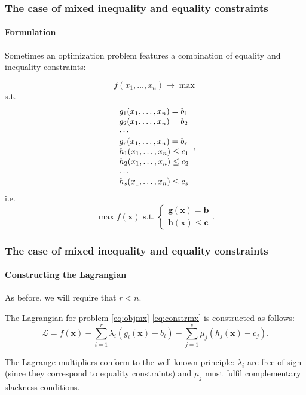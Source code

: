 \documentclass[10pt]{beamer}
\theoremstyle{definition}
\begin{document}
\begin{frame}[fragile]
\frametitle{The case of mixed inequality and equality constraints}
\framesubtitle{Formulation}
Sometimes an optimization problem features a combination of  equality and inequality constraints:

\begin{equation}
f(x_1,\ldots,x_n)\rightarrow \max 
\label{eq:objmx}
\end{equation}
s.t.
\begin{equation}
\begin{array}{l l l}
g_1(x_1,\ldots,x_n) = b_1\\
g_2(x_1,\ldots,x_n) = b_2\\
\cdots \\
g_r(x_1,\ldots,x_n) = b_r\\
h_1(x_1,\ldots,x_n) \leq c_1\\
h_2(x_1,\ldots,x_n) \leq c_2\\
\cdots \\
h_s(x_1,\ldots,x_n) \leq c_s\\
\end{array},
\label{eq:constrmx}
\end{equation}
i.e. \begin{equation*}
\max f(\mathbf{x}) \text{ s.t. } \left\{ \begin{array}{l}
\mathbf{g}(\mathbf{x}) = \mathbf{b}\\
\mathbf{h}(\mathbf{x})\leq \mathbf{c}
\end{array} \right. .
\end{equation*}
\end{frame}

\begin{frame}[fragile]
\frametitle{The case of mixed inequality and equality constraints}
\framesubtitle{Constructing the Lagrangian}
As before, we will require that $ r<n $. \bigskip

The Lagrangian for problem \eqref{eq:objmx}-\eqref{eq:constrmx} is constructed as follows:
\[ \mathcal{L} = f(\mathbf{x}) - \sum_{i=1}^{r}\lambda_i (g_i(\mathbf{x})-b_i) - \sum_{j=1}^{s}\mu_j (h_j(\mathbf{x})-c_j). \]

The Lagrange multipliers conform to the well-known principle: $ \lambda_i $ are free of sign (since they correspond to equality constraints) and $ \mu_j $ must fulfil complementary slackness conditions.
\end{frame}
\end{document}
